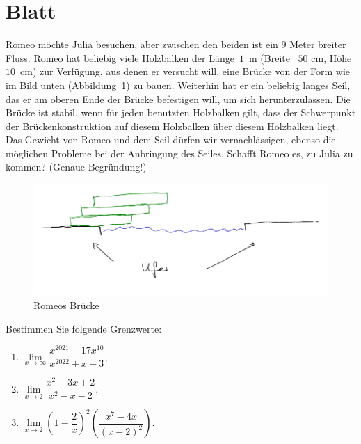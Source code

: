 \section{Blatt}


\begin{aufg}[6 Punkte]
Romeo m\"ochte Julia besuchen, aber zwischen den beiden ist ein $9$ Meter breiter Fluss. Romeo hat beliebig viele Holzbalken der L\"ange~$1$~m (Breite ~$50$ cm, H\"ohe $10$~cm) zur Verf\"ugung, aus denen er versucht will, eine Br\"ucke von der Form wie im Bild unten (Abbildung~\ref{fig:romeo}) zu bauen. Weiterhin hat er ein beliebig langes Seil, das er am oberen Ende der Br\"ucke befestigen will, um sich herunterzulassen. Die Br\"ucke ist stabil, wenn f\"ur jeden benutzten Holzbalken gilt, dass der Schwerpunkt der Brückenkonstruktion auf diesem Holzbalken \"uber diesem Holzbalken liegt. Das Gewicht von Romeo und dem Seil d\"urfen wir vernachl\"assigen, ebenso die m\"oglichen Probleme bei der Anbringung des Seiles. Schafft Romeo es, zu Julia zu kommen? (Genaue Begr\"undung!)
%
\begin{figure}
\includegraphics{romeo.pdf}
\caption{Romeos Br\"ucke}\label{fig:romeo} 
\end{figure}
%
\end{aufg}

\bigskip

\begin{lsg}
\end{lsg}


\bigskip


\begin{aufg}[6 Punkte]
Bestimmen Sie folgende Grenzwerte:
\begin{enumerate}[label=$\mathrm{(\roman*)}$, ref=$\mathrm{\roman*}$]
\setlength{\itemsep}{4pt}
\item $ \lim\limits_{x\to \infty} \dfrac{x^{2021}-17x^{10}}{x^{2022}+x+3} $,
\item $ \lim\limits_{x\to 2} \dfrac{x^{2}-3x+2}{x^{2}-x-2} $,
\item $ \lim\limits_{x\to 2} \left(1-\dfrac{2}{x}\right)^{2} \left( \dfrac{x^{7}-4x}{(x-2)^{2}} \right) $.
\end{enumerate}
\end{aufg}

